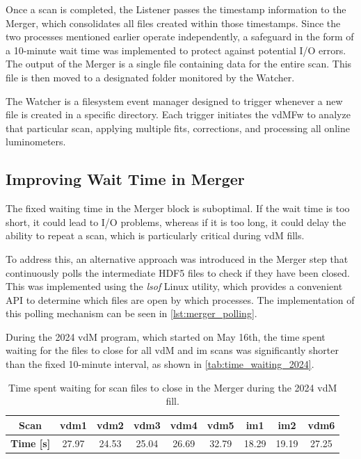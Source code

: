 Once a scan is completed, the Listener passes the timestamp information to the Merger, which consolidates all files created within those timestamps. Since the two processes mentioned earlier operate independently, a safeguard in the form of a 10-minute wait time was implemented to protect against potential I/O errors. The output of the Merger is a single file containing data for the entire scan. This file is then moved to a designated folder monitored by the Watcher.

The Watcher is a filesystem event manager designed to trigger whenever a new file is created in a specific directory. Each trigger initiates the vdMFw to analyze that particular scan, applying multiple fits, corrections, and processing all online luminometers.

\subsection{Improving Wait Time in Merger}

The fixed waiting time in the Merger block is suboptimal. If the wait time is too short, it could lead to I/O problems, whereas if it is too long, it could delay the ability to repeat a scan, which is particularly critical during vdM fills.

To address this, an alternative approach was introduced in the Merger step that continuously polls the intermediate HDF5 files to check if they have been closed. This was implemented using the \textit{lsof} Linux utility, which provides a convenient API to determine which files are open by which processes. The implementation of this polling mechanism can be seen in \autoref{lst:merger_polling}.

During the 2024 vdM program, which started on May 16th, the time spent waiting for the files to close for all vdM and im scans was significantly shorter than the fixed 10-minute interval, as shown in \autoref{tab:time_waiting_2024}.

\begin{table}[!htb]
	\centering
	\caption{Time spent waiting for scan files to close in the Merger during the 2024 vdM fill.}
	\begin{tabular}{|c|c|c|c|c|c|c|c|c|}
		\hline
		\textbf{Scan}     & vdm1  & vdm2  & vdm3  & vdm4  & vdm5  & im1   & im2   & vdm6  \\
		\hline
		\textbf{Time [s]} & 27.97 & 24.53 & 25.04 & 26.69 & 32.79 & 18.29 & 19.19 & 27.25 \\
		\hline
	\end{tabular}
	\label{tab:time_waiting_2024}
\end{table}

